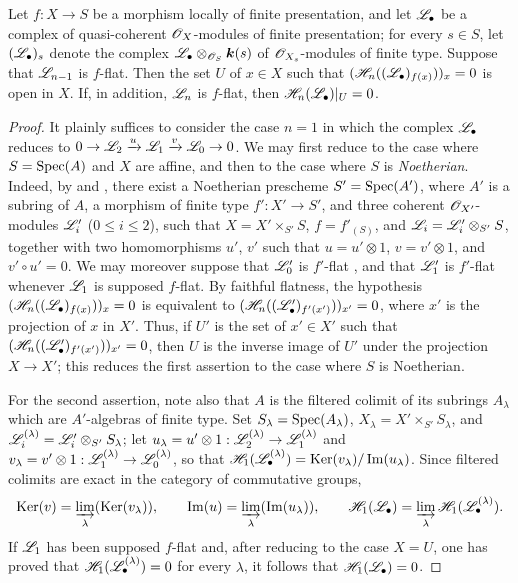 \begin{proposition}[12.3.3]
\label{IV.12.3.3}
Let $f:X\to S$ be a morphism locally of finite presentation, and let $\mathscr{L}_\bullet$ be a complex of quasi-coherent $\mathscr{O}_X$-modules of finite presentation; for every $s\in S$, let $(\mathscr{L}_\bullet)_s$ denote the complex $\mathscr{L}_\bullet\otimes_{\mathscr{O}_S}\boldsymbol{k}(s)$ of $\mathscr{O}_{X_s}$-modules of finite type.
Suppose that $\mathscr{L}_{n-1}$ is $f$-flat.
Then the set $U$ of $x\in X$ such that $(\mathscr{H}_n((\mathscr{L}_\bullet)_{f(x)}))_x=0$ is open in $X$.
If, in addition, $\mathscr{L}_n$ is $f$-flat, then $\mathscr{H}_n(\mathscr{L}_\bullet)|_U=0$.
\end{proposition}

\begin{proof}
It plainly suffices to consider the case $n=1$ in which the complex $\mathscr{L}_\bullet$ reduces to
$0\to\mathscr{L}_2\xrightarrow{u}\mathscr{L}_1\xrightarrow{v}\mathscr{L}_0\to 0$.
We may first reduce to the case where $S=\operatorname{Spec}(A)$ and $X$
are affine, and then to the case where $S$ is \emph{Noetherian}. Indeed, by  and , there exist a Noetherian prescheme $S'=\operatorname{Spec}(A')$, where $A'$ is a subring of $A$, a morphism of finite type $f':X'\to S'$, and three coherent $\mathscr{O}_{X'}$-modules $\mathscr{L}'_i$ ($0\leqslant i\leqslant 2$), such that
$X=X'\times_{S'}S$, $f=f'_{(S)}$, and $\mathscr{L}_i=\mathscr{L}'_i\otimes_{S'}S$, together with two homomorphisms $u'$, $v'$ such that $u=u'\otimes 1$, $v=v'\otimes 1$, and $v'\circ u'=0$.
We may moreover suppose that $\mathscr{L}'_0$ is $f'$-flat , and that $\mathscr{L}'_1$ is $f'$-flat whenever $\mathscr{L}_1$ is supposed $f$-flat.
By faithful flatness, the hypothesis
$(\mathscr{H}_n((\mathscr{L}_\bullet)_{f(x)}))_x=0$
is equivalent to
$(\mathscr{H}_n((\mathscr{L}'_\bullet)_{f'(x')}))_{x'}=0$,
where $x'$ is the projection of $x$ in $X'$.
Thus, if $U'$ is the set of $x'\in X'$ such that
$(\mathscr{H}_n((\mathscr{L}'_\bullet)_{f'(x')}))_{x'}=0$,
then $U$ is the inverse image of $U'$ under the projection $X\to X'$; this reduces the first assertion to the case where $S$ is Noetherian.

For the second assertion, note also that $A$ is the filtered colimit of its subrings $A_\lambda$ which are $A'$-algebras of finite type.
Set $S_\lambda=\operatorname{Spec}(A_\lambda)$,
$X_\lambda=X'\times_{S'}S_\lambda$, and
$\mathscr{L}^{(\lambda)}_i=\mathscr{L}'_i\otimes_{S'}S_\lambda$; let
$u_\lambda=u'\otimes 1:\mathscr{L}_2^{(\lambda)}\to\mathscr{L}_1^{(\lambda)}$ and
$v_\lambda=v'\otimes 1:\mathscr{L}_1^{(\lambda)}\to\mathscr{L}_0^{(\lambda)}$, so that
$\mathscr{H}_1(\mathscr{L}_\bullet^{(\lambda)})=\operatorname{Ker}(v_\lambda)/\operatorname{Im}(u_\lambda)$.
Since filtered colimits are exact in the category of commutative groups,
\[
  \operatorname{Ker}(v)=\varinjlim_\lambda(\operatorname{Ker}(v_\lambda)),\qquad
  \operatorname{Im}(u)=\varinjlim_\lambda(\operatorname{Im}(u_\lambda)),\qquad
  \mathscr{H}_1(\mathscr{L}_\bullet)=\varinjlim_\lambda\mathscr{H}_1(\mathscr{L}_\bullet^{(\lambda)}).
\]
If $\mathscr{L}_1$ has been supposed $f$-flat and, after reducing to the case $X=U$, one has proved that
$\mathscr{H}_1(\mathscr{L}_\bullet^{(\lambda)})=0$ for every $\lambda$, it follows that
$\mathscr{H}_1(\mathscr{L}_\bullet)=0$.


\end{proof}
